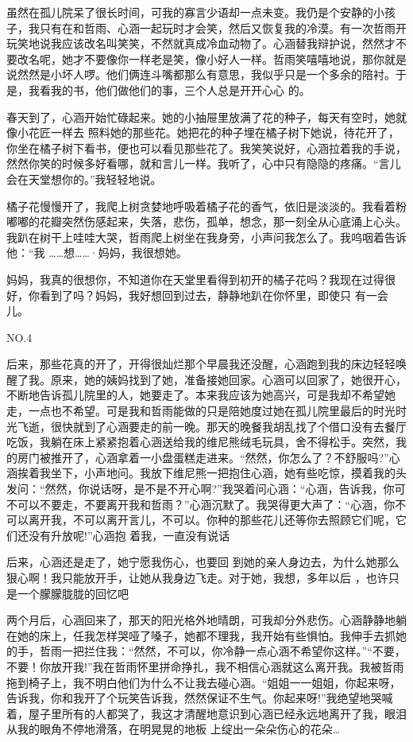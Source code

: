 \documentclass{article}
\begin{document}
虽然在孤儿院呆了很长时间，可我的寡言少语却一点未变。我仍是个安静的小孩子，我只有在和哲雨、心涵一起玩时才会笑，然后又恢复我的冷漠。有一次哲雨开玩笑地说我应该改名叫笑笑，不然就真成冷血动物了。心涵替我辩护说，然然才不要改名呢，她才不要像你一样老是笑，像小好人一样。哲雨笑嘻嘻地说，那你就是说然然是小坏人啰。他们俩连斗嘴都那么有意思，我似乎只是一个多余的陪衬。于是，我看我的书，他们做他们的事，三个人总是开开心心
的。 

春天到了，心涵开始忙碌起来。她的小抽屉里放满了花的种子，每天有空时，她就像小花匠一样去
\newpage
照料她的那些花。她把花的种子埋在橘子树下她说，待花开了，你坐在橘子树下看书，便也可以看见那些花了。我笑笑说好，心涵拉着我的手说，然然你笑的时候多好看哪，就和言儿一样。我听了，心中只有隐隐的疼痛。“言儿会在天堂想你的。”我轻轻地说。
 

橘子花慢慢开了，我爬上树贪婪地呼吸着橘子花的香气，依旧是淡淡的。我看着粉嘟嘟的花瓣突然伤感起来，失落，悲伤，孤单，想念，那一刻全从心底涌上心头。我趴在树干上哇哇大哭，哲雨爬上树坐在我身旁，小声问我怎么了。我呜咽着告诉他：“我
……想……·妈妈，我很想她。 

妈妈，我真的很想你，不知道你在天堂里看得到初开的橘子花吗？我现在过得很好，你看到了吗？妈妈，我好想回到过去，静静地趴在你怀里，即使只
有一会儿。 


NO.4 

\newpage

后来，那些花真的开了，开得很灿烂那个早晨我还没醒，心涵跑到我的床边轻轻唤醒了我。原来，她的姨妈找到了她，准备接她回家。心涵可以回家了，她很开心，不断地告诉孤儿院里的人，她要走了。本来我应该为她高兴，可是我却不希望她走，一点也不希望。可是我和哲雨能做的只是陪她度过她在孤儿院里最后的时光时光飞逝，很快就到了心涵要走的前一晚。那天的晚餐我胡乱找了个借口没有去餐厅吃饭，我躺在床上紧紧抱着心涵送给我的维尼熊绒毛玩具，舍不得松手。突然，我的房门被推开了，心涵拿着一小盘蛋糕走进来。“然然，你怎么了？不舒服吗?”心涵挨着我坐下，小声地问。我放下维尼熊一把抱住心涵，她有些吃惊，摸着我的头发问：“然然，你说话呀，是不是不开心啊?”我哭着问心涵：“心涵，告诉我，你可不可以不要走，不要离开我和哲雨？”心涵沉默了。我哭得更大声了：“心涵，你不可以离开我，不可以离开言儿，不可以。你种的那些花儿还等你去照顾它们呢，它们还没有升放呢!”心涵抱
着我，一直没有说话 

后来，心涵还是走了，她宁愿我伤心，也要回
\newpage
到她的亲人身边去，为什么她那么狠心啊！我只能放开手，让她从我身边飞走。对于她，我想，多年以后
，也许只是一个朦朦胧胧的回忆吧 

两个月后，心涵回来了，那天的阳光格外地晴朗，可我却分外悲伤。心涵静静地躺在她的床上，任我怎样哭哑了嗓子，她都不理我，我开始有些惧怕。我伸手去抓她的手，哲雨一把拦住我：“然然，不可以，你冷静一点心涵不希望你这样。”“不要，不要！你放开我!”我在哲雨怀里拼命挣扎，我不相信心涵就这么离开我。我被哲雨拖到椅子上，我不明白他们为什么不让我去碰心涵。“姐姐一一姐姐，你起来呀，告诉我，你和我开了个玩笑告诉我，然然保证不生气。你起来呀!”我绝望地哭喊着，屋子里所有的人都哭了，我这才清醒地意识到心涵已经永远地离开了我，眼泪从我的眼角不停地滑落，在明晃晃的地板
上绽出一朵朵伤心的花朵… 
\end{document}
